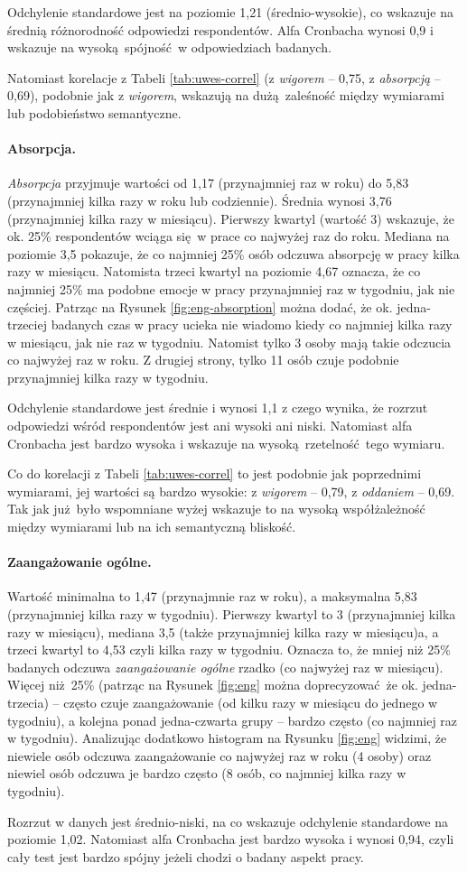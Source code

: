 Odchylenie standardowe jest na poziomie 1,21 (średnio-wysokie), co wskazuje na średnią różnorodność odpowiedzi respondentów. Alfa Cronbacha wynosi 0,9 i wskazuje na wysoką spójność w odpowiedziach badanych.

Natomiast korelacje z Tabeli \ref{tab:uwes-correl} (z \textit{wigorem} -- 0,75, z \textit{absorpcją} -- 0,69), podobnie jak z \textit{wigorem}, wskazują na dużą zaleśność między wymiarami lub podobieństwo semantyczne.

\paragraph{Absorpcja.} \textit{Absorpcja} przyjmuje wartości od 1,17 (przynajmniej raz w roku) do 5,83 (przynajmniej kilka razy w roku lub codziennie). Średnia wynosi 3,76 (przynajmniej kilka razy w miesiącu). Pierwszy kwartyl (wartość 3) wskazuje, że ok. 25\% respondentów wciąga się w prace co najwyżej raz do roku. Mediana na poziomie 3,5 pokazuje, że co najmniej 25\% osób odczuwa absorpcję w pracy kilka razy w miesiącu. Natomista trzeci kwartyl na poziomie
4,67 oznacza, że co najmniej 25\% ma podobne emocje w pracy przynajmniej raz w tygodniu, jak nie częściej. Patrząc na Rysunek \ref{fig:eng-absorption} można dodać, że ok. jedna-trzeciej badanych czas w pracy ucieka nie wiadomo kiedy co najmniej kilka razy w miesiącu, jak nie raz w tygodniu. Natomist tylko 3 osoby mają takie odczucia co najwyżej raz w roku. Z drugiej strony, tylko 11 osób czuje podobnie przynajmniej kilka razy w tygodniu.

Odchylenie standardowe jest średnie i wynosi 1,1 z czego wynika, że rozrzut odpowiedzi wśród respondentów jest ani wysoki ani niski. Natomiast alfa Cronbacha jest bardzo wysoka i wskazuje na wysoką rzetelność tego wymiaru.

Co do korelacji z Tabeli \ref{tab:uwes-correl} to jest podobnie jak poprzednimi wymiarami, jej wartości są bardzo wysokie: z \textit{wigorem} -- 0,79, z \textit{oddaniem} -- 0,69. Tak jak już było wspomniane wyżej wskazuje to na wysoką współżależność między wymiarami lub na ich semantyczną bliskość.  

\paragraph{Zaangażowanie ogólne.} Wartość minimalna to 1,47 (przynajmnie raz w roku), a maksymalna 5,83 (przynajmniej kilka razy w tygodniu). Pierwszy kwartyl to 3 (przynajmniej kilka razy w miesiącu), mediana 3,5 (także przynajmniej kilka razy w miesiącu)a, a trzeci kwartyl to 4,53 czyli kilka razy w tygodniu. Oznacza to, że mniej niż 25\% badanych odczuwa \textit{zaangażowanie ogólne} rzadko (co najwyżej raz w miesiącu). Więcej niż 25\% (patrząc na Rysunek \ref{fig:eng} można
doprecyzować że ok. jedna-trzecia) -- często czuje zaangażowanie
(od kilku razy w miesiącu do jednego w tygodniu), a kolejna ponad jedna-czwarta grupy -- bardzo często (co najmniej raz w tygodniu). Analizując dodatkowo histogram na Rysunku \ref{fig:eng} widzimi, że niewiele osób odczuwa zaangażowanie co najwyżej raz w roku (4 osoby) oraz niewiel osób odczuwa je bardzo często (8 osób, co najmniej kilka razy w tygodniu).

Rozrzut w danych jest średnio-niski, na co wskazuje odchylenie standardowe na poziomie 1,02. Natomiast alfa Cronbacha jest bardzo wysoka i wynosi 0,94, czyli cały test jest bardzo spójny jeżeli chodzi o badany aspekt pracy.

